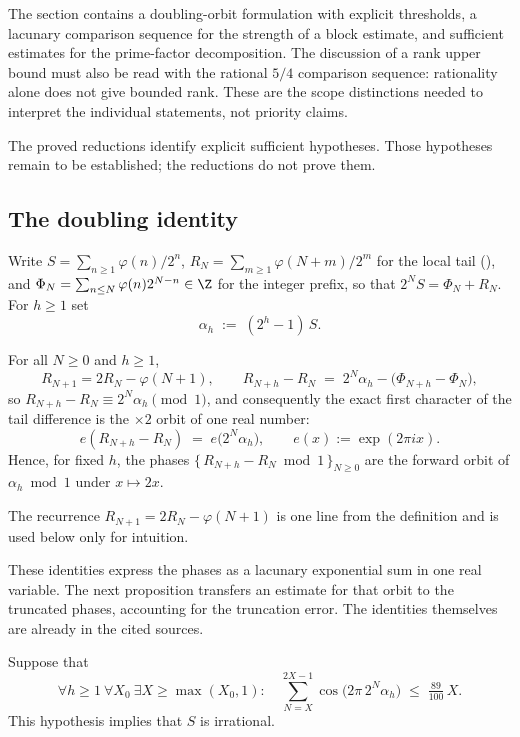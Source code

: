 The section contains a doubling-orbit formulation with explicit thresholds,
a lacunary comparison sequence for the strength of a block estimate,
and sufficient estimates for the prime-factor decomposition. The discussion of a rank upper bound
must also be read with the rational $5/4$ comparison sequence: rationality
alone does not give bounded rank. These are the scope distinctions needed
to interpret the individual statements, not priority claims.


The proved reductions identify explicit sufficient hypotheses. Those
hypotheses remain to be established; the reductions do not prove them.

\subsection{The doubling identity}

Write $S=\sum_{n\ge 1}\varphi(n)/2^n$, $R_N=\sum_{m\ge 1}\varphi(N+m)/2^m$
for the local tail
(),
and $\Phi_N=\sum_{n\le N}\varphi(n)2^{N-n}\in\Z$ for the integer prefix, so
that $2^N S=\Phi_N+R_N$. For $h\ge 1$ set
\[
  \alpha_h \;:=\; (2^h-1)\,S .
\]

\begin{lem}\label{lem:orbit}
For all $N\ge 0$ and $h\ge 1$,
\[
  R_{N+1}=2R_N-\varphi(N+1),
  \qquad
  R_{N+h}-R_N \;=\; 2^N\alpha_h-\bigl(\Phi_{N+h}-\Phi_N\bigr),
\]
so $R_{N+h}-R_N \equiv 2^N\alpha_h \pmod 1$, and consequently the exact
first character of the tail difference is the $\times 2$ orbit of one real
number:
\[
  e(R_{N+h}-R_N)
  \;=\; e\bigl(2^N\alpha_h\bigr),
  \qquad e(x):=\exp(2\pi i x).
\]
Hence, for fixed $h$, the phases $\{\,R_{N+h}-R_N \bmod 1\,\}_{N\ge 0}$ are
the forward orbit of $\alpha_h \bmod 1$ under $x\mapsto 2x$.
\end{lem}

\noindent
The recurrence $R_{N+1}=2R_N-\varphi(N+1)$ is one line from the definition
and is used below only for intuition.

These identities express the phases as a lacunary exponential sum in
one real variable. The next proposition transfers an estimate for that
orbit to the truncated phases, accounting for the truncation error.
The identities themselves are already in the cited sources.


\begin{prop}\label{prop:transfer}
Suppose that
\[
  \forall h\ge 1\ \forall X_0\ \exists X\ge \max(X_0,1):\quad
  \sum_{N=X}^{2X-1}\cos\bigl(2\pi\,2^{N}\alpha_h\bigr)\;\le\;\tfrac{89}{100}\,X .
\]
This hypothesis implies that $S$ is irrational.
\end{prop}

